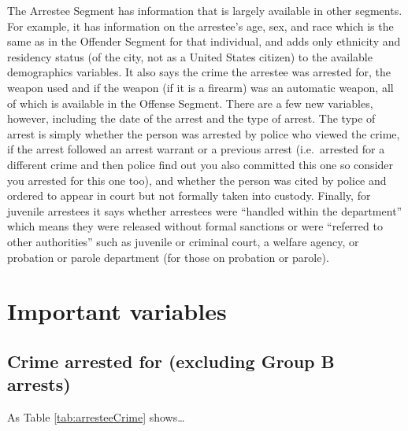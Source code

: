 \documentclass[
  12pt,
  openany]{book}
\begin{document}
The Arrestee Segment has information that is largely available in other segments. For example, it has information on the arrestee's age, sex, and race which is the same as in the Offender Segment for that individual, and adds only ethnicity and residency status (of the city, not as a United States citizen) to the available demographics variables. It also says the crime the arrestee was arrested for, the weapon used and if the weapon (if it is a firearm) was an automatic weapon, all of which is available in the Offense Segment. There are a few new variables, however, including the date of the arrest and the type of arrest. The type of arrest is simply whether the person was arrested by police who viewed the crime, if the arrest followed an arrest warrant or a previous arrest (i.e.~arrested for a different crime and then police find out you also committed this one so consider you arrested for this one too), and whether the person was cited by police and ordered to appear in court but not formally taken into custody. Finally, for juvenile arrestees it says whether arrestees were ``handled within the department'' which means they were released without formal sanctions or were ``referred to other authorities'' such as juvenile or criminal court, a welfare agency, or probation or parole department (for those on probation or parole).

\hypertarget{important-variables-4}{%
\section{Important variables}\label{important-variables-4}}

\hypertarget{crime-arrested-for-excluding-group-b-arrests}{%
\subsection{Crime arrested for (excluding Group B arrests)}\label{crime-arrested-for-excluding-group-b-arrests}}

As Table \ref{tab:arresteeCrime} shows\ldots{}
\end{document}
